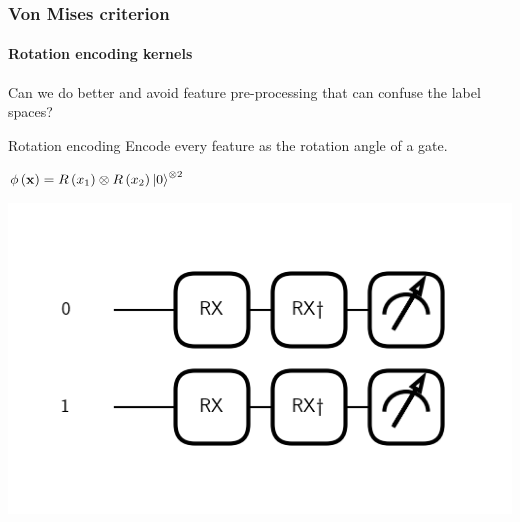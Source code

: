 \documentclass{beamer}
\begin{document}
    \begin{frame}
        \frametitle{Von Mises criterion}
        \framesubtitle{Rotation encoding kernels}

        \footnotesize
        Can we do better and avoid feature pre-processing that can confuse the label spaces?
        
        \begin{block}{\small Rotation encoding}
            \footnotesize
            Encode every feature as the rotation angle of a gate.

            \begin{minipage}{.45\textwidth}
                $\phi\left( \mathbf{x} \right) = R\left( x_1 \right)\otimes R\left( x_2 \right) \ket{0}^{\otimes 2}$
            \end{minipage}
            \begin{minipage}{.45\textwidth}
                \centering
                \includegraphics[width=.7\textwidth]{pics/rot-enc-circuit.png}
            \end{minipage}
        \end{block}


\end{frame}
\end{document}
